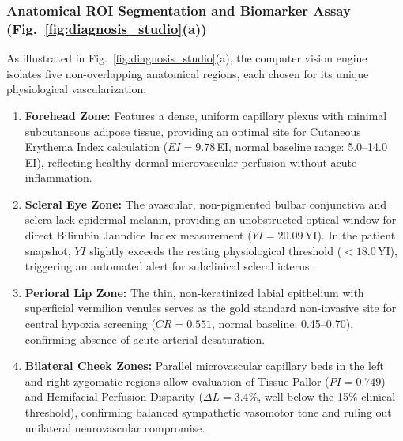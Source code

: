 \documentclass[journal]{IEEEtran}
\begin{document}
\subsubsection{Anatomical ROI Segmentation and Biomarker Assay (Fig.~\ref{fig:diagnosis_studio}(a))}
As illustrated in Fig.~\ref{fig:diagnosis_studio}(a), the computer vision engine isolates five non-overlapping anatomical regions, each chosen for its unique physiological vascularization:
\begin{enumerate}
    \item \textbf{Forehead Zone:} Features a dense, uniform capillary plexus with minimal subcutaneous adipose tissue, providing an optimal site for Cutaneous Erythema Index calculation ($EI = 9.78$\,EI, normal baseline range: 5.0--14.0\,EI), reflecting healthy dermal microvascular perfusion without acute inflammation.
    \item \textbf{Scleral Eye Zone:} The avascular, non-pigmented bulbar conjunctiva and sclera lack epidermal melanin, providing an unobstructed optical window for direct Bilirubin Jaundice Index measurement ($YI = 20.09$\,YI). In the patient snapshot, $YI$ slightly exceeds the resting physiological threshold ($<18.0$\,YI), triggering an automated alert for subclinical scleral icterus.
    \item \textbf{Perioral Lip Zone:} The thin, non-keratinized labial epithelium with superficial vermilion venules serves as the gold standard non-invasive site for central hypoxia screening ($CR = 0.551$, normal baseline: 0.45--0.70), confirming absence of acute arterial desaturation.
    \item \textbf{Bilateral Cheek Zones:} Parallel microvascular capillary beds in the left and right zygomatic regions allow evaluation of Tissue Pallor ($PI = 0.749$) and Hemifacial Perfusion Disparity ($\Delta L = 3.4\%$, well below the 15\% clinical threshold), confirming balanced sympathetic vasomotor tone and ruling out unilateral neurovascular compromise.
\end{enumerate}
\end{document}
